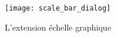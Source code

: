 \begin{figure}[ht]
   \begin{center}
   \caption{L'extension \'echelle graphique \nixcaption}\label{fig:scale_bar}\smallskip
   \texttt{[image: scale\_bar\_dialog]}
\end{center}  
\end{figure}
